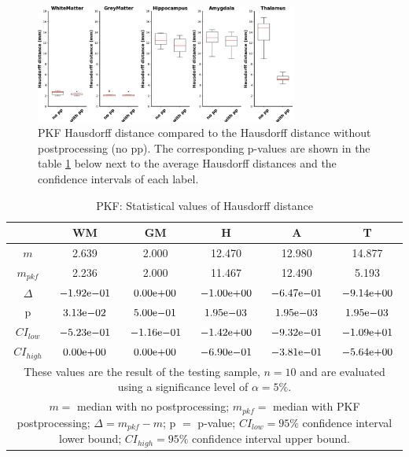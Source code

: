 \documentclass[journal]{IEEEtran}
\begin{document}
\begin{figure}[ht]
\centering
\includegraphics[width=3.4in]{img/boxplots/PKF-HD.png}
\caption{PKF Hausdorff distance compared to the Hausdorff distance without postprocessing (no pp). The corresponding p-values are shown in the table \ref{tbl_pkf_hd} below next to the average Hausdorff distances and the confidence intervals of each label.}
\label{fig_pkf-hd}
\end{figure}

\begin{table}[ht]

\renewcommand{\arraystretch}{1.3}
\caption{PKF: Statistical values of Hausdorff distance}
\label{tbl_pkf_hd}
\centering
\tabcolsep=0.06cm
\begin{tabular}{c|c|c|c|c|c}
\hline
 & WM & GM & H & A & T\\
\hline
$m$ &2.639&2.000&12.470&12.980&14.877\\
$m_{pkf}$&2.236&2.000&11.467&12.490&5.193\\
$\Delta$&${-1.92}\mathrm{e}{-01}$&${0.00}\mathrm{e}{+00}$&${-1.00}\mathrm{e}{+00}$&${-6.47}\mathrm{e}{-01}$&${-9.14}\mathrm{e}{+00}$\\
p&${3.13}\mathrm{e}{-02}$&${5.00}\mathrm{e}{-01}$&${1.95}\mathrm{e}{-03}$&${1.95}\mathrm{e}{-03}$&${1.95}\mathrm{e}{-03}$\\
$CI_{low}$&${-5.23}\mathrm{e}{-01}$&${-1.16}\mathrm{e}{-01}$&${-1.42}\mathrm{e}{+00}$&${-9.32}\mathrm{e}{-01}$&${-1.09}\mathrm{e}{+01}$\\
$CI_{high}$&${0.00}\mathrm{e}{+00}$&${0.00}\mathrm{e}{+00}$&${-6.90}\mathrm{e}{-01}$&${-3.81}\mathrm{e}{-01}$&${-5.64}\mathrm{e}{+00}$\\
\hline
\multicolumn{6}{p{3.4in}}{These values are the result of the testing sample, $n=10$ and are evaluated using a significance level of $\alpha = 5\%$. }\\
\multicolumn{6}{p{3.4in}}{$m=$ median with no postprocessing; $m_{pkf}=$ median with PKF postprocessing; $\Delta=m_{pkf}-m$; p $=$ p-value;  $CI_{low}= 95\%$ confidence interval lower bound; $CI_{high}= 95\%$ confidence interval upper bound.}\\

\end{tabular}

\end{table}
\end{document}
